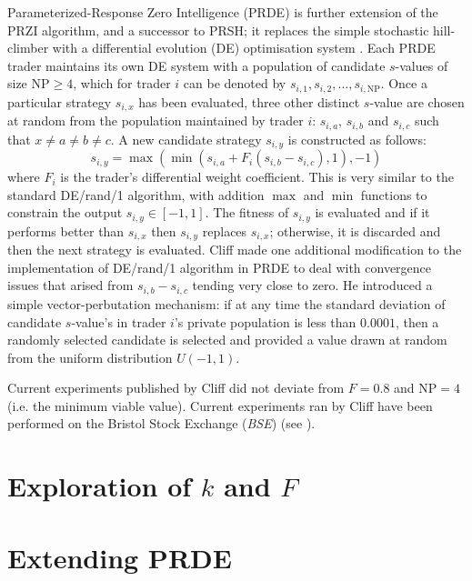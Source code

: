 \documentclass[conference]{IEEEtran}
\begin{document}
Parameterized-Response Zero Intelligence (PRDE) \cite{PRDE} is further extension of the PRZI algorithm, and a successor to PRSH; it replaces the simple stochastic hill-climber with a differential evolution (DE) optimisation system \cite{StornPrice}.
Each PRDE trader maintains its own DE system with a population of candidate $s$-values of size $\mathrm{NP}\ge4$, which for trader $i$ can be denoted by $s_{i,1},s_{i,2},...,s_{i,\mathrm{NP}}$.
Once a particular strategy $s_{i,x}$ has been evaluated, three other distinct $s$-value are chosen at random from the population maintained by trader $i$: $s_{i,a}$, $s_{i,b}$ and $s_{i,c}$ such that $x\ne a\ne b\ne c$.
A new candidate strategy $s_{i,y}$ is constructed as follows:
\[
s_{i,y}=\max(\min(s_{i,a}+F_i(s_{i,b}-s_{i,c}),1), -1)
\]
where $F_i$ is the trader's differential weight coefficient.
This is very similar to the standard DE/rand/1 algorithm, with addition $\max$ and $\min$ functions to constrain the output $s_{i,y}\in[-1,1]$.
The fitness of $s_{i,y}$ is evaluated and if it performs better than $s_{i,x}$ then $s_{i,y}$ replaces $s_{i,x}$; otherwise, it is discarded and then the next strategy is evaluated.
Cliff made one additional modification to the implementation of DE/rand/1 algorithm in PRDE to deal with convergence issues that arised from $s_{i,b}-s_{i,c}$ tending very close to zero.
He introduced a simple vector-perbutation mechanism: if at any time the standard deviation of candidate $s$-value's in trader $i$'s private population is less than $0.0001$, then a randomly selected candidate is selected and provided a value drawn at random from the uniform distribution $U(-1,1)$.

Current experiments published by Cliff did not deviate from $F=0.8$ and $\mathrm{NP}=4$ (i.e. the minimum viable value).
Current experiments ran by Cliff have been performed on the Bristol Stock Exchange (\textit{BSE}) (see \cite{BSE, BSEPaper}).

\section{Exploration of $k$ and $F$}



\section{Extending PRDE}



\end{document}
